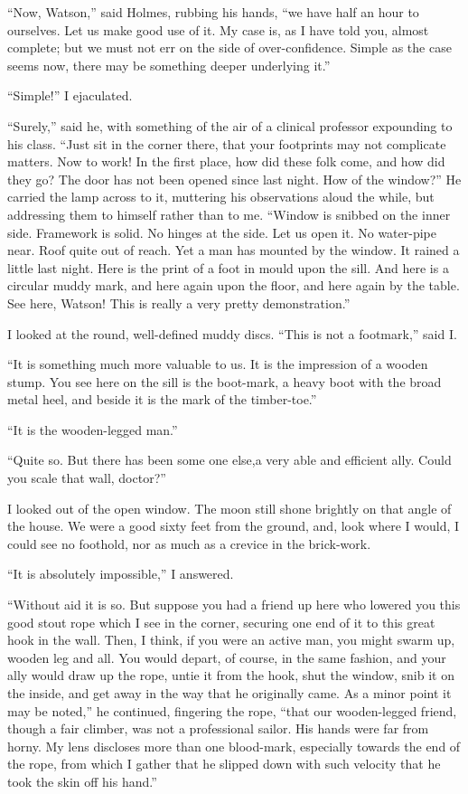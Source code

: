 \documentclass[12pt,english,oneside]{book}
\begin{document}

{}``Now, Watson,'' said Holmes, rubbing his hands, {}``we have
half an hour to ourselves. Let us make good use of it. My case is,
as I have told you, almost complete; but we must not err on the side
of over-confidence. Simple as the case seems now, there may be something
deeper underlying it.''

{}``Simple!'' I ejaculated.

{}``Surely,'' said he, with something of the air of a clinical professor
expounding to his class. {}``Just sit in the corner there, that your
footprints may not complicate matters. Now to work! In the first place,
how did these folk come, and how did they go? The door has not been
opened since last night. How of the window?'' He carried the lamp
across to it, muttering his observations aloud the while, but addressing
them to himself rather than to me. {}``Window is snibbed on the inner
side. Framework is solid. No hinges at the side. Let us open it. No
water-pipe near. Roof quite out of reach. Yet a man has mounted by
the window. It rained a little last night. Here is the print of a
foot in mould upon the sill. And here is a circular muddy mark, and
here again upon the floor, and here again by the table. See here,
Watson! This is really a very pretty demonstration.''

I looked at the round, well-defined muddy discs. {}``This is not
a footmark,'' said I.

{}``It is something much more valuable to us. It is the impression
of a wooden stump. You see here on the sill is the boot-mark, a heavy
boot with the broad metal heel, and beside it is the mark of the timber-toe.''

{}``It is the wooden-legged man.''

{}``Quite so. But there has been some one else,\mdsh{---}a very
able and efficient ally. Could you scale that wall, doctor?''

I looked out of the open window. The moon still shone brightly on
that angle of the house. We were a good sixty feet from the ground,
and, look where I would, I could see no foothold, nor as much as a
crevice in the brick-work.

{}``It is absolutely impossible,'' I answered.

{}``Without aid it is so. But suppose you had a friend up here who
lowered you this good stout rope which I see in the corner, securing
one end of it to this great hook in the wall. Then, I think, if you
were an active man, you might swarm up, wooden leg and all. You would
depart, of course, in the same fashion, and your ally would draw up
the rope, untie it from the hook, shut the window, snib it on the
inside, and get away in the way that he originally came. As a minor
point it may be noted,'' he continued, fingering the rope, {}``that
our wooden-legged friend, though a fair climber, was not a professional
sailor. His hands were far from horny. My lens discloses more than
one blood-mark, especially towards the end of the rope, from which
I gather that he slipped down with such velocity that he took the
skin off his hand.''
\end{document}
